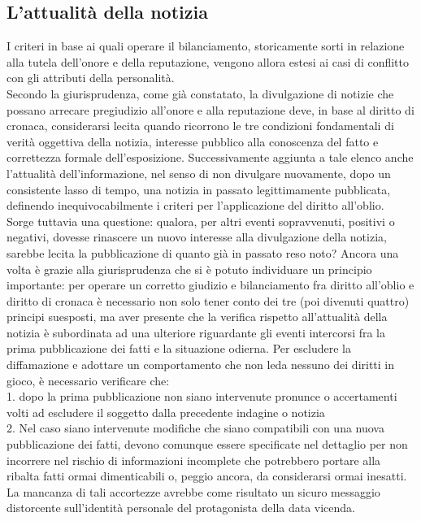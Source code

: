 
\subsection{L'attualità della notizia}
I criteri in base ai quali operare il bilanciamento, storicamente sorti in relazione alla tutela dell'onore e della reputazione, vengono allora estesi ai casi di conflitto con gli attributi della personalità.
\\Secondo la giurisprudenza, come già constatato, la divulgazione di notizie che possano arrecare pregiudizio all'onore e alla reputazione deve, in base al diritto di cronaca, considerarsi lecita quando ricorrono le tre condizioni fondamentali di verità oggettiva della notizia, interesse pubblico alla conoscenza del fatto e correttezza formale dell'esposizione.
Successivamente aggiunta a tale elenco anche l'attualità dell'informazione, nel senso di non divulgare nuovamente, dopo un consistente lasso di tempo, una notizia in passato legittimamente pubblicata, definendo inequivocabilmente i criteri per l'applicazione del diritto all'oblio.
\\Sorge tuttavia una questione: qualora, per altri eventi sopravvenuti, positivi o negativi, dovesse rinascere un nuovo interesse alla divulgazione della notizia, sarebbe lecita la pubblicazione di quanto già in passato reso noto?
Ancora una volta è grazie alla giurisprudenza che si è potuto individuare un principio importante: per operare un corretto giudizio e bilanciamento fra diritto all'oblio e diritto di cronaca è necessario non solo tener conto dei tre (poi divenuti quattro) principi suesposti, ma aver presente che la verifica rispetto all'attualità della notizia è subordinata ad una ulteriore riguardante gli eventi intercorsi fra la prima pubblicazione dei fatti e la situazione odierna.
Per escludere la diffamazione e adottare un comportamento che non leda nessuno dei diritti in gioco, è necessario verificare che:
\\1. dopo la prima pubblicazione non siano intervenute pronunce o accertamenti volti ad escludere il soggetto dalla precedente indagine o notizia
\\2. Nel caso siano intervenute modifiche che siano compatibili con una nuova pubblicazione dei fatti, devono comunque essere specificate nel dettaglio per non incorrere nel rischio di informazioni incomplete che potrebbero portare alla ribalta fatti ormai dimenticabili o, peggio ancora, da considerarsi ormai inesatti.
La mancanza di tali accortezze avrebbe come risultato un sicuro messaggio distorcente sull'identità personale del protagonista della data vicenda.

